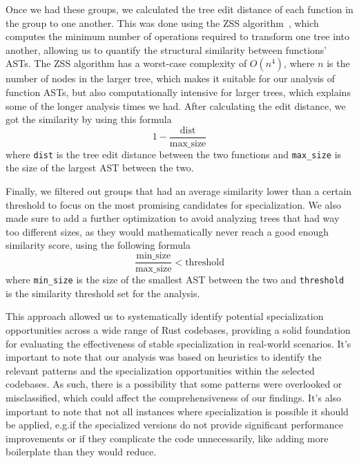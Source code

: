 Once we had these groups, we calculated the tree edit distance of each function in the group to one another.
This was done using the ZSS algorithm~\cite{ZSSTreeEditDistance89}, which computes the minimum number of operations required to transform one tree into another, allowing us to quantify the structural similarity between functions' ASTs.
The ZSS algorithm has a worst-case complexity of \(O(n^4)\), where \(n\) is the number of nodes in the larger tree, which makes it suitable for our analysis of function ASTs, but also computationally intensive for larger trees, which explains some of the longer analysis times we had.
After calculating the edit distance, we got the similarity by using this formula $$1 - \frac{\text{dist}}{\text{max\_size}}$$ where \texttt{dist} is the tree edit distance between the two functions and \texttt{max\_size} is the size of the largest AST between the two.

Finally, we filtered out groups that had an average similarity lower than a certain threshold to focus on the most promising candidates for specialization.
We also made sure to add a further optimization to avoid analyzing trees that had way too different sizes, as they would mathematically never reach a good enough similarity score, using the following formula $$\frac{\text{min\_size}}{\text{max\_size}} < \text{threshold}$$ where \texttt{min\_size} is the size of the smallest AST between the two and \texttt{threshold} is the similarity threshold set for the analysis.

This approach allowed us to systematically identify potential specialization opportunities across a wide range of Rust codebases, providing a solid foundation for evaluating the effectiveness of stable specialization in real-world scenarios.
It's important to note that our analysis was based on heuristics to identify the relevant patterns and the specialization opportunities within the selected codebases.
As such, there is a possibility that some patterns were overlooked or misclassified, which could affect the comprehensiveness of our findings.
It's also important to note that not all instances where specialization is possible it should be applied, e.g.\@ if the specialized versions do not provide significant performance improvements or if they complicate the code unnecessarily, like adding more boilerplate than they would reduce.

